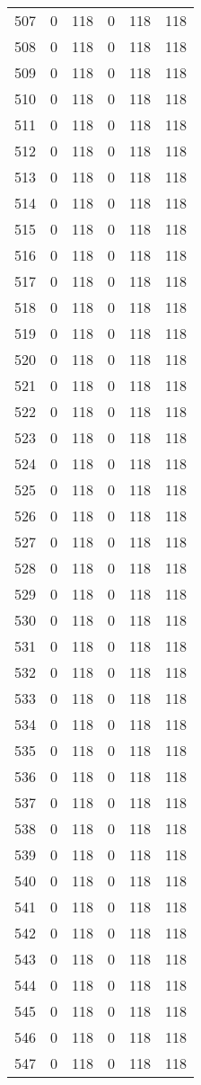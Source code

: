 \documentclass[a4paper]{ctexart}
\begin{document}
\begin{longtable}{p{1cm}|p{2cm}|p{2cm}|p{2cm}|P{2cm}|p{2cm}}
		507&0&118&0&118&118\\
		508&0&118&0&118&118\\
		509&0&118&0&118&118\\
		510&0&118&0&118&118\\
		511&0&118&0&118&118\\
		512&0&118&0&118&118\\
		513&0&118&0&118&118\\
		514&0&118&0&118&118\\
		515&0&118&0&118&118\\
		516&0&118&0&118&118\\
		517&0&118&0&118&118\\
		518&0&118&0&118&118\\
		519&0&118&0&118&118\\
		520&0&118&0&118&118\\
		521&0&118&0&118&118\\
		522&0&118&0&118&118\\
		523&0&118&0&118&118\\
		524&0&118&0&118&118\\
		525&0&118&0&118&118\\
		526&0&118&0&118&118\\
		527&0&118&0&118&118\\
		528&0&118&0&118&118\\
		529&0&118&0&118&118\\
		530&0&118&0&118&118\\
		531&0&118&0&118&118\\
		532&0&118&0&118&118\\
		533&0&118&0&118&118\\
		534&0&118&0&118&118\\
		535&0&118&0&118&118\\
		536&0&118&0&118&118\\
		537&0&118&0&118&118\\
		538&0&118&0&118&118\\
		539&0&118&0&118&118\\
		540&0&118&0&118&118\\
		541&0&118&0&118&118\\
		542&0&118&0&118&118\\
		543&0&118&0&118&118\\
		544&0&118&0&118&118\\
		545&0&118&0&118&118\\
		546&0&118&0&118&118\\
		547&0&118&0&118&118\\

\end{longtable}
\end{document}
